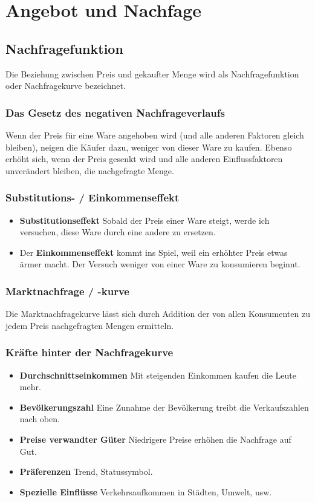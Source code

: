 \documentclass[10pt]{scrartcl}
\begin{document}
\pagebreak
\newpage
\section{Angebot und Nachfage}
\subsection{Nachfragefunktion}
Die Beziehung zwischen Preis und gekaufter Menge wird als Nachfragefunktion oder Nachfragekurve bezeichnet.
\subsubsection{Das Gesetz des negativen Nachfrageverlaufs}
Wenn der Preis für eine Ware angehoben wird (und alle anderen Faktoren gleich bleiben), neigen die Käufer dazu, weniger von dieser Ware zu kaufen. Ebenso erhöht sich, wenn der Preis gesenkt wird und alle anderen Einflussfaktoren unverändert bleiben, die nachgefragte Menge.
\subsubsection{Substitutions- / Einkommenseffekt}
\begin{itemize}
\item {\bf Substitutionseffekt }Sobald der Preis einer Ware steigt, werde ich versuchen, diese Ware durch eine andere zu ersetzen.  
\item Der {\bf Einkommenseffekt} kommt ins Spiel, weil ein erhöhter Preis etwas ärmer macht. Der Versuch weniger von einer Ware zu konsumieren beginnt.
\end{itemize}
\subsubsection{Marktnachfrage / -kurve}
Die Marktnachfragekurve lässt sich durch Addition der von allen Konsumenten zu jedem Preis nachgefragten Mengen ermitteln.
\subsubsection{Kräfte hinter der Nachfragekurve}
\begin{itemize}
\item {\bf Durchschnittseinkommen} Mit steigenden Einkommen kaufen die Leute mehr.
\item {\bf Bevölkerungszahl } Eine Zunahme der Bevölkerung treibt die Verkaufszahlen nach oben.
\item {\bf Preise verwandter Güter} Niedrigere Preise erhöhen die Nachfrage auf Gut.
\item {\bf Präferenzen } Trend, Statussymbol.
\item {\bf Spezielle Einflüsse }  Verkehrsaufkommen in Städten, Umwelt, usw.
\end{itemize}
\end{document}

